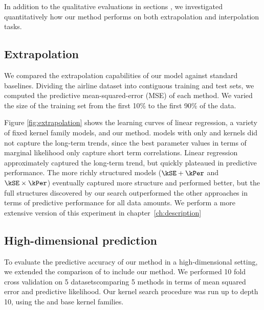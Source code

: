 In addition to the qualitative evaluations in sections , we investigated quantitatively how our method performs on both extrapolation and interpolation tasks.

\subsection{Extrapolation}



We compared the extrapolation capabilities of our model against standard baselines\footnotemark.
Dividing the airline dataset into contiguous training and test sets, we computed the predictive mean-squared-error (MSE) of each method.
We varied the size of the training set from the first 10\% to the first 90\% of the data.

Figure \ref{fig:extrapolation} shows the learning curves of linear regression, a variety of fixed kernel family \gp{} models, and our method.  
\gp{} models with only \kSE{} and \kPer{} kernels did not capture the long-term trends, since the best parameter values in terms of \gp{} marginal likelihood only capture short term correlations. 
Linear regression approximately captured the long-term trend, but quickly plateaued in predictive performance.
The more richly structured \gp{} models (${\kSE + \kPer}$ and ${\kSE \times \kPer}$) eventually captured more structure and performed better, but the full structures discovered by our search outperformed the other approaches in terms of predictive performance for all data amounts.
We perform a more extensive version of this experiment in chapter~\ref{ch:description}


\subsection{High-dimensional prediction}

To evaluate the predictive accuracy of our method in a high-dimensional setting, we extended the comparison of \cite{Duvenaud2011-wb} to include our method.
We performed 10 fold cross validation on 5 datasets\footnotemark comparing 5 methods in terms of mean squared error and predictive likelihood.
Our kernel search procedure was run up to depth 10, using the \SE{} and \RQ{} base kernel families.

